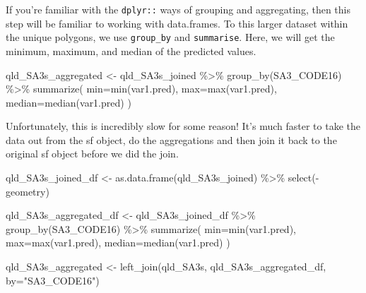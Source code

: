 \documentclass[
]{book}
\newenvironment{Shaded}{\begin{snugshade}}{\end{snugshade}}
\newcommand{\AttributeTok}[1]{\textcolor[rgb]{0.77,0.63,0.00}{#1}}
\newcommand{\FunctionTok}[1]{\textcolor[rgb]{0.00,0.00,0.00}{#1}}
\newcommand{\NormalTok}[1]{#1}
\newcommand{\OtherTok}[1]{\textcolor[rgb]{0.56,0.35,0.01}{#1}}
\newcommand{\SpecialCharTok}[1]{\textcolor[rgb]{0.00,0.00,0.00}{#1}}
\newcommand{\StringTok}[1]{\textcolor[rgb]{0.31,0.60,0.02}{#1}}
\begin{document}
If you're familiar with the \texttt{dplyr::} ways of grouping and aggregating, then this step will be familiar to working with data.frames. To this larger dataset within the unique polygons, we use \texttt{group\_by} and \texttt{summarise}. Here, we will get the minimum, maximum, and median of the predicted values.

\begin{Shaded}
\begin{Highlighting}[]
\NormalTok{qld\_SA3s\_aggregated }\OtherTok{\textless{}{-}} 
\NormalTok{  qld\_SA3s\_joined }\SpecialCharTok{\%\textgreater{}\%}
  \FunctionTok{group\_by}\NormalTok{(SA3\_CODE16) }\SpecialCharTok{\%\textgreater{}\%}
  \FunctionTok{summarize}\NormalTok{(}
    \AttributeTok{min=}\FunctionTok{min}\NormalTok{(var1.pred),}
    \AttributeTok{max=}\FunctionTok{max}\NormalTok{(var1.pred),}
    \AttributeTok{median=}\FunctionTok{median}\NormalTok{(var1.pred)}
\NormalTok{  )}
\end{Highlighting}
\end{Shaded}

Unfortunately, this is incredibly slow for some reason! It's much faster to take the data out from the sf object, do the aggregations and then join it back to the original sf object before we did the join.

\begin{Shaded}
\begin{Highlighting}[]
\NormalTok{qld\_SA3s\_joined\_df }\OtherTok{\textless{}{-}} \FunctionTok{as.data.frame}\NormalTok{(qld\_SA3s\_joined) }\SpecialCharTok{\%\textgreater{}\%} \FunctionTok{select}\NormalTok{(}\SpecialCharTok{{-}}\NormalTok{geometry)}

\NormalTok{qld\_SA3s\_aggregated\_df }\OtherTok{\textless{}{-}} 
\NormalTok{  qld\_SA3s\_joined\_df }\SpecialCharTok{\%\textgreater{}\%}
  \FunctionTok{group\_by}\NormalTok{(SA3\_CODE16) }\SpecialCharTok{\%\textgreater{}\%}
  \FunctionTok{summarize}\NormalTok{(}
    \AttributeTok{min=}\FunctionTok{min}\NormalTok{(var1.pred),}
    \AttributeTok{max=}\FunctionTok{max}\NormalTok{(var1.pred),}
    \AttributeTok{median=}\FunctionTok{median}\NormalTok{(var1.pred)}
\NormalTok{  )}

\NormalTok{qld\_SA3s\_aggregated }\OtherTok{\textless{}{-}} \FunctionTok{left\_join}\NormalTok{(qld\_SA3s, qld\_SA3s\_aggregated\_df, }\AttributeTok{by=}\StringTok{"SA3\_CODE16"}\NormalTok{) }
\end{Highlighting}
\end{Shaded}
\end{document}
